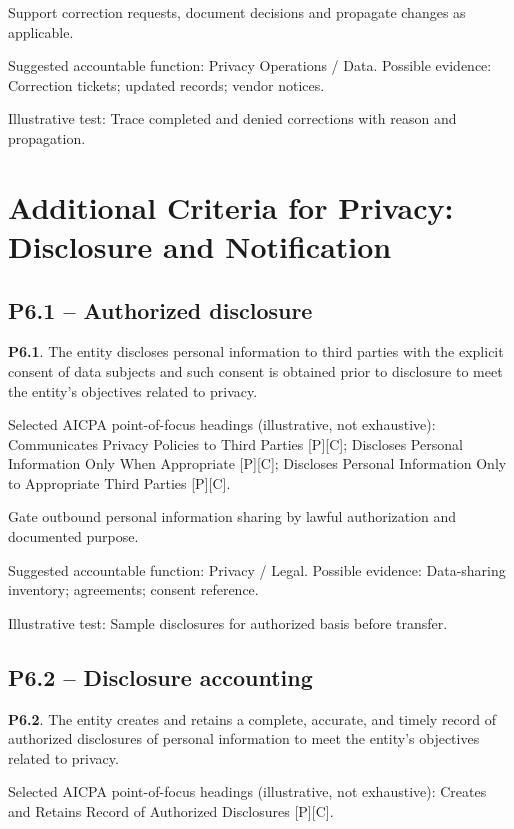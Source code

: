 \documentclass[10pt,oneside]{report}
\begin{document}
\begin{engineeringbox}
Support correction requests, document decisions and propagate changes as applicable.
\end{engineeringbox}
Suggested accountable function: Privacy Operations / Data. Possible evidence: Correction tickets; updated records; vendor notices.

Illustrative test: Trace completed and denied corrections with reason and propagation.

\section{Additional Criteria for Privacy: Disclosure and Notification}
\subsection*{P6.1 -- Authorized disclosure}
\begin{aicpabox}
\textbf{P6.1}. The entity discloses personal information to third parties with the explicit consent of data subjects and such consent is obtained prior to disclosure to meet the entity's objectives related to privacy.\par{}
\end{aicpabox}
Selected AICPA point-of-focus headings (illustrative, not exhaustive): Communicates Privacy Policies to Third Parties [P][C]; Discloses Personal Information Only When Appropriate [P][C]; Discloses Personal Information Only to Appropriate Third Parties [P][C].

\begin{engineeringbox}
Gate outbound personal information sharing by lawful authorization and documented purpose.
\end{engineeringbox}
Suggested accountable function: Privacy / Legal. Possible evidence: Data-sharing inventory; agreements; consent reference.

Illustrative test: Sample disclosures for authorized basis before transfer.

\subsection*{P6.2 -- Disclosure accounting}
\begin{aicpabox}
\textbf{P6.2}. The entity creates and retains a complete, accurate, and timely record of authorized disclosures of personal information to meet the entity's objectives related to privacy.\par{}
\end{aicpabox}
Selected AICPA point-of-focus headings (illustrative, not exhaustive): Creates and Retains Record of Authorized Disclosures [P][C].
\end{document}
